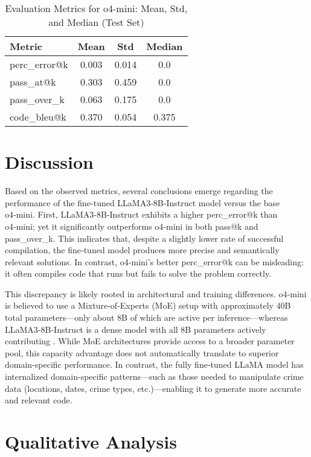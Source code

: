 \begin{table}[h!]
\centering
\caption{Evaluation Metrics for o4-mini: Mean, Std, and Median (Test Set)}
{%
\begin{tabular}{l|ccc}
\toprule
\textbf{Metric} & \textbf{Mean} & \textbf{Std} & \textbf{Median} \\
\midrule
perc\_error@k     & 0.003 & 0.014 & 0.0   \\
pass\_at@k        & 0.303 & 0.459 & 0.0   \\
pass\_over\_k      & 0.063 & 0.175 & 0.0   \\
code\_bleu@k      & 0.370 & 0.054 & 0.375 \\
\bottomrule
\end{tabular}
}
\label{tab:metrics_new_data}
\end{table}


\section{Discussion}

Based on the observed metrics, several conclusions emerge regarding the performance of the fine-tuned LLaMA3‑8B‑Instruct model versus the base o4‑mini. First, LLaMA3‑8B‑Instruct exhibits a higher perc\_error@k than o4‑mini; yet it significantly outperforms o4‑mini in both pass@k and pass\_over\_k. This indicates that, despite a slightly lower rate of successful compilation, the fine‑tuned model produces more precise and semantically relevant solutions. In contrast, o4‑mini’s better perc\_error@k can be misleading: it often compiles code that runs but fails to solve the problem correctly.

This discrepancy is likely rooted in architectural and training differences. o4‑mini is believed to use a Mixture‑of‑Experts (MoE) setup with approximately 40B total parameters—only about 8B of which are active per inference—whereas LLaMA3‑8B‑Instruct is a dense model with all 8B parameters actively contributing . While MoE architectures provide access to a broader parameter pool, this capacity advantage does not automatically translate to superior domain-specific performance. In contrast, the fully fine‑tuned LLaMA model has internalized domain-specific patterns—such as those needed to manipulate crime data (locations, dates, crime types, etc.)—enabling it to generate more accurate and relevant code.
\section{Qualitative Analysis}

